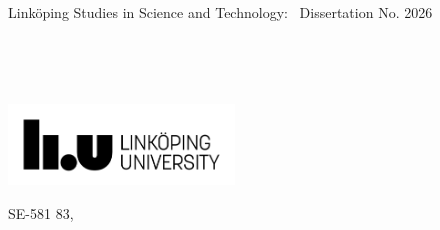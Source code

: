%



 
\begin{titlepage}

\begin{center}

Link\"{o}ping Studies in Science and Technology:~
Dissertation No. 2026


 \hfill
 \vspace{1.0cm}

\begingroup
\Huge\spacedallcaps{\myTitle} \\ \bigskip %

\huge\spacedallcaps{\mySubtitle} \\ \bigskip\medskip %
\vspace{1cm}
\huge\spacedlowsmallcaps{\myName} %
\endgroup



\end{center}


\hfill\vfill



 

\begin{minipage}[b]{0.5\textwidth}
\includegraphics[width=6.0cm]{gfx/logo}
\end{minipage}\;\;
 \begin{minipage}[b]{0.42\textwidth}
 \myDepartment \newline
 \myUni \newline
 SE-581 83, \myLocation \newline
\end{minipage}
 

\end{titlepage}
 